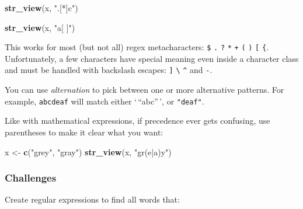 \documentclass[]{book}
\newenvironment{Shaded}{\begin{snugshade}}{\end{snugshade}}
\newcommand{\KeywordTok}[1]{\textcolor[rgb]{0.13,0.29,0.53}{\textbf{#1}}}
\newcommand{\StringTok}[1]{\textcolor[rgb]{0.31,0.60,0.02}{#1}}
\newcommand{\NormalTok}[1]{#1}
\begin{document}
\hypertarget{htmlwidget-6a2314a79aa854fab7df}{}

\begin{Shaded}
\begin{Highlighting}[]
\KeywordTok{str_view}\NormalTok{(x, }\StringTok{".[*]c"}\NormalTok{)}
\end{Highlighting}
\end{Shaded}

\hypertarget{htmlwidget-fb37aa630b9d9968db84}{}

\begin{Shaded}
\begin{Highlighting}[]
\KeywordTok{str_view}\NormalTok{(x, }\StringTok{"a[ ]"}\NormalTok{)}
\end{Highlighting}
\end{Shaded}

\hypertarget{htmlwidget-fa04ac5febadaac18a3d}{}

This works for most (but not all) regex metacharacters: \texttt{\$}
\texttt{.} \texttt{\textbar{}} \texttt{?} \texttt{*} \texttt{+}
\texttt{(} \texttt{)} \texttt{{[}} \texttt{\{}. Unfortunately, a few
characters have special meaning even inside a character class and must
be handled with backslash escapes: \texttt{{]}}
\texttt{\textbackslash{}} \texttt{\^{}} and \texttt{-}.

You can use \emph{alternation} to pick between one or more alternative
patterns. For example, \texttt{abc\textbar{}deaf} will match either
`\,``abc''\,', or \texttt{"deaf"}.

Like with mathematical expressions, if precedence ever gets confusing,
use parentheses to make it clear what you want:

\begin{Shaded}
\begin{Highlighting}[]
\NormalTok{x <-}\StringTok{ }\KeywordTok{c}\NormalTok{(}\StringTok{"grey"}\NormalTok{, }\StringTok{"gray"}\NormalTok{)}
\KeywordTok{str_view}\NormalTok{(x, }\StringTok{"gr(e|a)y"}\NormalTok{)}
\end{Highlighting}
\end{Shaded}

\hypertarget{htmlwidget-826abaa365f54c0c9337}{}

\subsubsection*{Challenges}\label{challenges-16}

Create regular expressions to find all words that:
\end{document}

